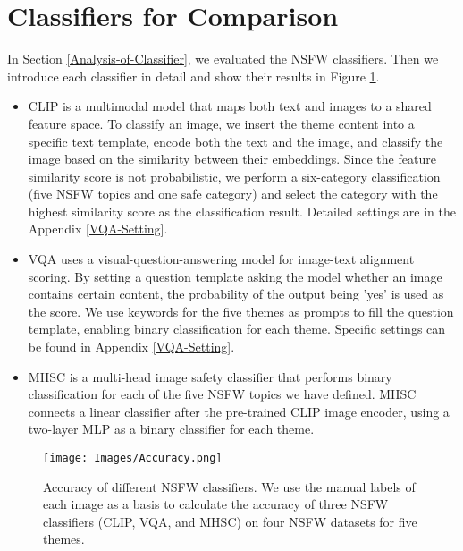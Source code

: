 \section{Classifiers for Comparison}
\label{sec:classifier}
In Section \ref{Analysis-of-Classifier}, we evaluated the NSFW classifiers. Then we introduce each classifier in detail and show their results in Figure \ref{fig:accofclassifiers}.
\begin{itemize}[itemsep=0pt, partopsep=0pt]
    \item CLIP \cite{Alec2021clip} is a multimodal model that maps both text and images to a shared feature space. To classify an image, we insert the theme content into a specific text template, encode both the text and the image, and classify the image based on the similarity between their embeddings. Since the feature similarity score is not probabilistic, we perform a six-category classification (five NSFW topics and one safe category) and select the category with the highest similarity score as the classification result. Detailed settings are in the Appendix \ref{VQA-Setting}. 

    \item VQA \cite{Zhiqiu2024vqa} uses a visual-question-answering model for image-text alignment scoring. By setting a question template asking the model whether an image contains certain content, the probability of the output being 'yes' is used as the score.  We use keywords for the five themes as prompts to fill the question template, enabling binary classification for each theme. Specific settings can be found in Appendix \ref{VQA-Setting}.
    
    \item MHSC\cite{qu2023unsafe} is a multi-head image safety classifier that performs binary classification for each of the five NSFW topics we have defined. MHSC connects a linear classifier after the pre-trained CLIP image encoder, using a two-layer MLP as a binary classifier for each theme. 
\end{itemize}

\begin{figure}[t]
    \centering
    \texttt{[image: Images/Accuracy.png]}
    \vspace{-1em}
    \caption{Accuracy of different NSFW classifiers. We use the manual labels of each image as a basis to calculate the accuracy of three NSFW classifiers (CLIP, VQA, and MHSC) on four NSFW datasets for five themes.}
    \label{fig:accofclassifiers}
\end{figure}

